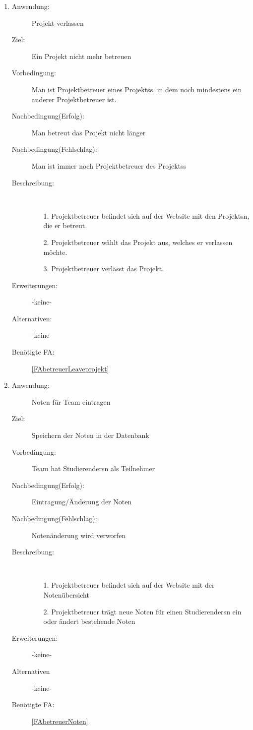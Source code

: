 \documentclass[parskip=full]{scrartcl}
\newcommand{\swtLabel}[1]{\textbf{/#1\arabic*0/}}
\begin{document}
\begin{enumerate} [label=\swtLabel{B}]
  
  \item \label{UCbetreuerLeaveProjekt}
	\begin{description}
  		\item[Anwendung:] \gls{Projekt} verlassen
  		\item[Ziel:] Ein \gls{Projekt} nicht mehr betreuen
  		\item[Vorbedingung:] Man ist \gls{Projektbetreuer} eines \glspl{Projekt}s, in dem noch mindestens
  		ein anderer \gls{Projektbetreuer} ist.
  		\item[Nachbedingung(Erfolg):] Man betreut das \gls{Projekt} nicht länger
  		\item[Nachbedingung(Fehlschlag):] Man ist immer noch \gls{Projektbetreuer} des \glspl{Projekt}s
  		\item[Beschreibung:]~
  	\begin{enumerate} 
  	  \item[1.] \gls{Projektbetreuer} befindet sich auf der Website mit den \glspl{Projekt}n, die
  	  er betreut.
  	  \item[2.] \gls{Projektbetreuer} wählt das \gls{Projekt} aus, welches er verlassen möchte.
  	  \item[3.] \gls{Projektbetreuer} verlässt das \gls{Projekt}.
  	\end{enumerate}
  	\item[Erweiterungen:] -keine-
  	\item[Alternativen:] -keine-
  	\item[Benötigte FA:] \ref{FAbetreuerLeaveprojekt}
  \end{description}
   
  
  \item \label{UCbetreuerNoteneintragung}
    \begin{description}
  	\item[Anwendung:] Noten für \gls{Team} eintragen
  	\item[Ziel:] Speichern der Noten in der Datenbank
  	\item[Vorbedingung:] \gls{Team} hat \glspl{Studierender}n als Teilnehmer
  	\item[Nachbedingung(Erfolg):] Eintragung/Änderung der Noten
  	\item[Nachbedingung(Fehlschlag):] Notenänderung wird verworfen
  	\item[Beschreibung:]~
  	\begin{enumerate} 
  	  \item[1.] \gls{Projektbetreuer} befindet sich auf der Website mit der Notenübersicht
  	  \item[2.] \gls{Projektbetreuer} trägt neue Noten für einen \glspl{Studierender}n ein oder
  	  ändert bestehende Noten
  	\end{enumerate}
  	\item[Erweiterungen:] -keine-
  	\item[Alternativen] -keine-
  	\item[Benötigte FA:] \ref{FAbetreuerNoten}
  \end{description}
  

\end{enumerate}
\end{document}
